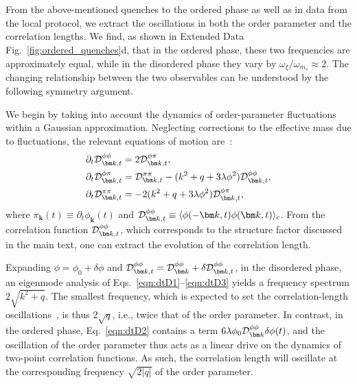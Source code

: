\documentclass[reprint,twocolumn,secnumarabic,amssymb, aps, prx]{revtex4-2}
\begin{document}
\\
\\
From the above-mentioned quenches to the ordered phase as well as in data from the local protocol, we extract the oscillations in both the order parameter and the correlation lengths. We find, as shown in Extended Data Fig.~\ref{fig:ordered_quenches}d, that in the ordered phase, these two frequencies are approximately equal, while in the disordered phase they vary by $\omega_{\xi}/\omega_{m_s} \approx 2$. The changing relationship between the two observables can be understood by the following symmetry argument. 

We begin by taking into account the dynamics of order-parameter fluctuations within a Gaussian approximation. Neglecting corrections to the effective mass due to fluctuations, the relevant equations of motion are~\cite{chandran2013equilibration,dolgirev2022periodic}:
\begin{alignat}{1}
    \partial_t {\cal D}^{\phi\phi}_{\bm k,t} &= 2{\cal D}^{\phi\pi}_{\bm k,t},\label{eqn:dtD1}\\
    \partial_t {\cal D}^{\phi\pi}_{\bm k,t} &= {\cal D}^{\pi\pi}_{\bm k,t}  
    - (k^2 + q +  3\lambda \phi^2){\cal D}^{\phi\phi}_{\bm k,t},\label{eqn:dtD2}\\
    \partial_t {\cal D}^{\pi\pi}_{\bm k,t} &= - 2(k^2 + q +  3\lambda \phi^2){\cal D}^{\phi\pi}_{\bm k,t}, \label{eqn:dtD3}
\end{alignat}
where $\pi_{\bm k}(t) \equiv \partial_t \phi_{\bm k}(t)$ and ${\cal D}^{\phi\phi}_{\bm k,t} \equiv \langle \phi({-\bm k,t})\phi({\bm k,t})\rangle_c$. From the correlation function ${\cal D}^{\phi\phi}_{\bm k,t}$, which corresponds to the structure factor discussed in the main text, one can extract the evolution of the correlation length.

Expanding $\phi = \phi_0 + \delta \phi$ and ${\cal D}^{\phi\phi}_{\bm k,t} = {\cal D}^{\phi\phi}_{\bm k} + \delta{\cal D}^{\phi\phi}_{\bm k,t}$, in the disordered phase, an eigenmode analysis of Eqs.~\eqref{eqn:dtD1}--\eqref{eqn:dtD3} yields a frequency spectrum $2\sqrt{k^2 + q}$. The smallest frequency, which is expected to set the correlation-length oscillations~\cite{dolgirev2022periodic}, is thus $2\sqrt{q}$, i.e., twice that of the order parameter.
In contrast, in the ordered phase, Eq.~\eqref{eqn:dtD2} contains a term $6\lambda \phi_0 {\cal D}_{\bm k}^{\phi\phi} \delta\phi(t)$, and the oscillation  of the order parameter thus acts as a linear drive on the dynamics of two-point correlation functions. 
As such, the correlation length will oscillate at the corresponding frequency $\sqrt{2|q|}$ of the order parameter.\\
\end{document}
